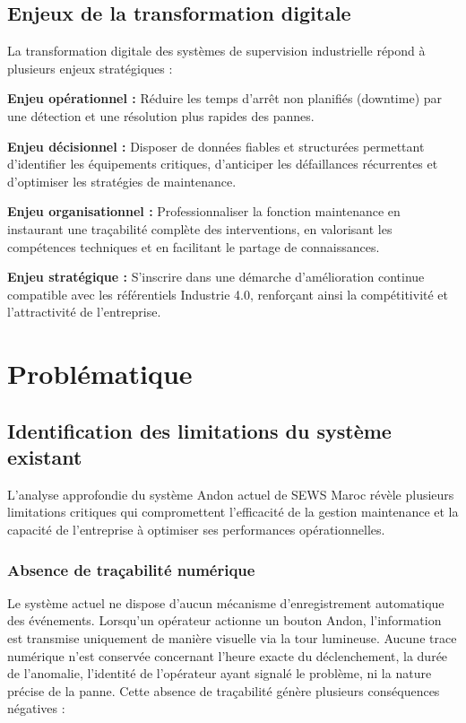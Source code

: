 \subsection{Enjeux de la transformation digitale}

La transformation digitale des systèmes de supervision industrielle répond à plusieurs enjeux stratégiques :

\textbf{Enjeu opérationnel :} Réduire les temps d'arrêt non planifiés (downtime) par une détection et une résolution plus rapides des pannes.

\textbf{Enjeu décisionnel :} Disposer de données fiables et structurées permettant d'identifier les équipements critiques, d'anticiper les défaillances récurrentes et d'optimiser les stratégies de maintenance.

\textbf{Enjeu organisationnel :} Professionnaliser la fonction maintenance en instaurant une traçabilité complète des interventions, en valorisant les compétences techniques et en facilitant le partage de connaissances.

\textbf{Enjeu stratégique :} S'inscrire dans une démarche d'amélioration continue compatible avec les référentiels Industrie 4.0, renforçant ainsi la compétitivité et l'attractivité de l'entreprise.


\section{Problématique}

\subsection{Identification des limitations du système existant}

L'analyse approfondie du système Andon actuel de SEWS Maroc révèle plusieurs limitations critiques qui compromettent l'efficacité de la gestion maintenance et la capacité de l'entreprise à optimiser ses performances opérationnelles.

\subsubsection{Absence de traçabilité numérique}

Le système actuel ne dispose d'aucun mécanisme d'enregistrement automatique des événements. Lorsqu'un opérateur actionne un bouton Andon, l'information est transmise uniquement de manière visuelle via la tour lumineuse. Aucune trace numérique n'est conservée concernant l'heure exacte du déclenchement, la durée de l'anomalie, l'identité de l'opérateur ayant signalé le problème, ni la nature précise de la panne. Cette absence de traçabilité génère plusieurs conséquences négatives :

